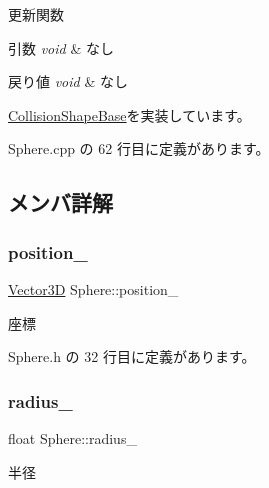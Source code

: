 更新関数 


\begin{DoxyParams}{引数}
{\em void} & なし \\
\hline
\end{DoxyParams}

\begin{DoxyRetVals}{戻り値}
{\em void} & なし \\
\hline
\end{DoxyRetVals}


\mbox{\hyperlink{class_collision_shape_base_a7aaa0f4de4e208f168f78e3445313929}{Collision\+Shape\+Base}}を実装しています。



 Sphere.\+cpp の 62 行目に定義があります。



\subsection{メンバ詳解}
\mbox{\label{class_sphere_a5a18bfcc7abcdfbd6802ec622dfa5590}} 
\subsubsection{\texorpdfstring{position\+\_\+}{position\_}}
{\footnotesize\ttfamily \mbox{\hyperlink{class_vector3_d}{Vector3D}} Sphere\+::position\+\_\+\hspace{0.3cm}{\ttfamily [private]}}



座標 



 Sphere.\+h の 32 行目に定義があります。

\mbox{\label{class_sphere_ac2924d9ad22bfad1ed1914c069c188dc}} 
\subsubsection{\texorpdfstring{radius\+\_\+}{radius\_}}
{\footnotesize\ttfamily float Sphere\+::radius\+\_\+\hspace{0.3cm}{\ttfamily [private]}}



半径 



